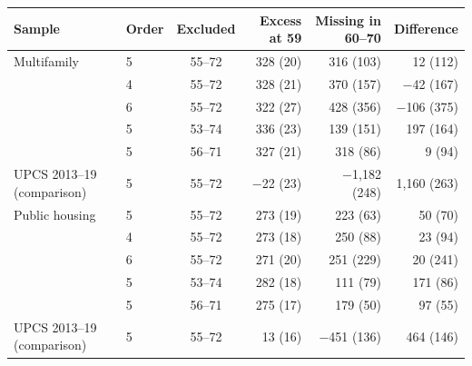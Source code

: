 \begin{tabular}{llcrrr}
\toprule
Sample & Order & Excluded & Excess at 59 & Missing in 60--70 & Difference \\
\midrule
Multifamily & 5 & 55--72 & 328 (20) & 316 (103) & 12 (112) \\
 & 4 & 55--72 & 328 (21) & 370 (157) & $-$42 (167) \\
 & 6 & 55--72 & 322 (27) & 428 (356) & $-$106 (375) \\
 & 5 & 53--74 & 336 (23) & 139 (151) & 197 (164) \\
 & 5 & 56--71 & 327 (21) & 318 (86) & 9 (94) \\
\quad UPCS 2013--19 (comparison) & 5 & 55--72 & $-$22 (23) & $-$1,182 (248) & 1,160 (263) \\
\midrule
Public housing & 5 & 55--72 & 273 (19) & 223 (63) & 50 (70) \\
 & 4 & 55--72 & 273 (18) & 250 (88) & 23 (94) \\
 & 6 & 55--72 & 271 (20) & 251 (229) & 20 (241) \\
 & 5 & 53--74 & 282 (18) & 111 (79) & 171 (86) \\
 & 5 & 56--71 & 275 (17) & 179 (50) & 97 (55) \\
\quad UPCS 2013--19 (comparison) & 5 & 55--72 & 13 (16) & $-$451 (136) & 464 (146) \\
\bottomrule
\end{tabular}
